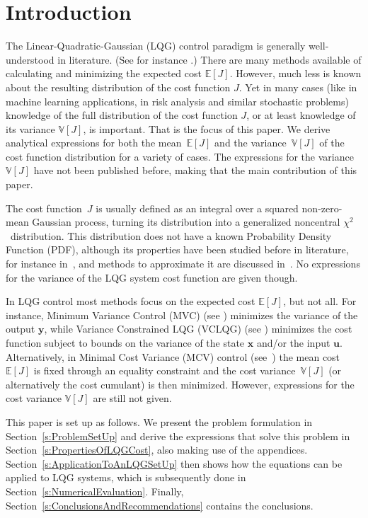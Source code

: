 \documentclass[twocolumn]{autart}
\newcommand{\ve}[1]{{\boldsymbol{#1}}} \newcommand{\tr}{\mbox{tr}} \newcommand{\ex}{\mathds{E}} \newcommand{\va}{\mathds{V}}
\begin{document}
\section{Introduction}

The Linear-Quadratic-Gaussian (LQG) control paradigm is generally well-understood in literature. (See for instance \cite{LQBook,MFCBook,DMCSBook,StochasticControlBook}.) There are many methods available of calculating and minimizing the expected cost $\ex[J]$. However, much less is known about the resulting distribution of the cost function $J$. Yet in many cases (like in machine learning applications, in risk analysis and similar stochastic problems) knowledge of the full distribution of the cost function $J$, or at least knowledge of its variance $\va[J]$, is important. That is the focus of this paper. We derive analytical expressions for both the mean~$\ex[J]$ and the variance~$\va[J]$ of the cost function distribution for a variety of cases. The expressions for the variance~$\va[J]$ have not been published before, making that the main contribution of this paper.

The cost function~$J$ is usually defined as an integral over a squared non-zero-mean Gaussian process, turning its distribution into a generalized noncentral $\chi^2$~distribution. This distribution does not have a known Probability Density Function (PDF), although its properties have been studied before in literature, for instance in~\cite{MathematicalAnalysisOfRandomNoise,DistributionOfTheTimeAveragePower,LQGCostPDFApproximation}, and methods to approximate it are discussed in~\cite{QFRVBook,ChiSquareDistribution}. No expressions for the variance of the LQG system cost function are given though.

In LQG control most methods focus on the expected cost $\ex[J]$, but not all. For instance, Minimum Variance Control (MVC) (see \cite{StochasticControlBook}) minimizes the variance of the output $\ve{y}$, while Variance Constrained LQG (VCLQG) (see \cite{FuzzyWeightsForVCLQG,LQGControllerWithVarianceConstraints}) minimizes the cost function subject to bounds on the variance of the state $\ve{x}$ and/or the input $\ve{u}$. Alternatively, in Minimal Cost Variance (MCV) control (see~\cite{ControlUsingCostCumulants,StatisticalControlBook}) the mean cost~$\ex[J]$ is fixed through an equality constraint and the cost variance~$\va[J]$ (or alternatively the cost cumulant) is then minimized. However, expressions for the cost variance $\va[J]$ are still not given.

This paper is set up as follows. We present the problem formulation in Section~\ref{s:ProblemSetUp} and derive the expressions that solve this problem in Section~\ref{s:PropertiesOfLQGCost}, also making use of the appendices. Section~\ref{s:ApplicationToAnLQGSetUp} then shows how the equations can be applied to LQG systems, which is subsequently done in Section~\ref{s:NumericalEvaluation}. Finally, Section~\ref{s:ConclusionsAndRecommendations} contains the conclusions.
\end{document}
